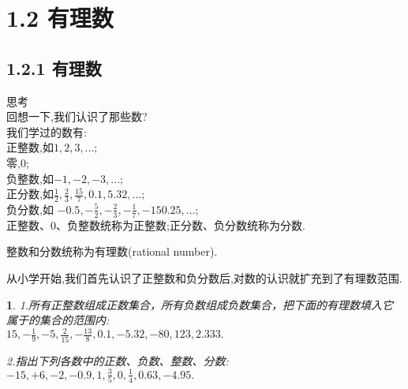 \documentclass{article}
\newtheorem{exercise}{ }
\begin{document}
	\section*{1.2 有理数}
	\subsection*{1.2.1 有理数}
	思考\\
	\indent 回想一下,我们认识了那些数?\\
	\indent 我们学过的数有:\\
	\indent 正整数,如$1,2,3,...;$\\
	\indent 零,$0$;\\
	\indent 负整数,如$-1,-2,-3,...;$\\
	\indent 正分数,如$\frac{1}{2},\frac{2}{3},\frac{15}{7},0.1,5.32,...;$\\
	\indent 负分数,如 $-0.5,-\frac{5}{2},-\frac{2}{3},-\frac{1}{7},-150.25,...;$\\
	\indent 正整数、0、负整数统称为正整数;正分数、负分数统称为分数.\\
		\begin{definition}
			整数和分数统称为有理数(rational number).\\
		\end{definition}

	\indent 从小学开始,我们首先认识了正整数和负分数后,对数的认识就扩充到了有理数范围.\\
	
		\begin{exercise}
			1.所有正整数组成正数集合，所有负数组成负数集合，把下面的有理数填入它属于的集合的范围内:\\
			\indent $15,-\frac{1}{9},-5,\frac{2}{15},-\frac{13}{8},0.1,-5.32,-80,123,2.333.$\\
			
			
			2.指出下列各数中的正数、负数、整数、分数:\\
			\indent $-15,+6,-2,-0.9,1,\frac{3}{5},0,\frac{1}{4},0.63,-4.95.$\\
		\end{exercise}
	
\end{document}

